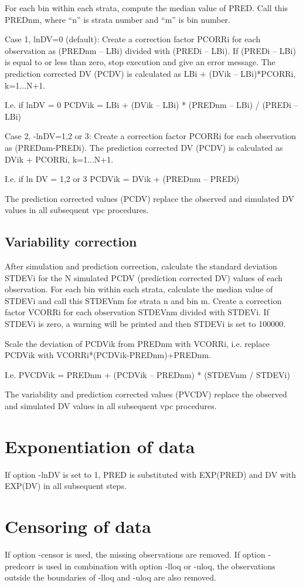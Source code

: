 For each bin within each strata, compute the median value of PRED. Call this PREDnm, where “n” is strata number and “m” is bin number. 

Case 1, lnDV=0 (default): Create a correction factor PCORRi for each observation as (PREDnm – LBi) divided with (PREDi – LBi). If (PREDi – LBi) is equal to or less than zero, stop execution and give an error message. The prediction corrected DV (PCDV) is calculated as 
LBi + (DVik – LBi)*PCORRi, k=1...N+1. 

I.e. if lnDV = 0		PCDVik = LBi + (DVik – LBi) * (PREDnm – LBi) / (PREDi – LBi)

Case 2, -lnDV=1,2 or 3: Create a correction factor PCORRi for each observation as (PREDnm-PREDi). The prediction corrected DV (PCDV) is calculated as DVik + PCORRi, k=1...N+1.   

I.e. if ln DV = 1,2 or 3	PCDVik = DVik + (PREDnm – PREDi)

The prediction corrected values (PCDV) replace the observed and simulated DV values in all subsequent vpc procedures.

\subsection{Variability correction}
After simulation and prediction correction, calculate the standard deviation STDEVi for  the N simulated PCDV (prediction corrected DV) values of each observation. For each bin within each strata, calculate the median value of STDEVi and call this STDEVnm for strata n and bin m. Create a correction factor VCORRi for each observation STDEVnm divided with STDEVi. If STDEVi is zero, a warning will be printed and then STDEVi is set to 100000.

Scale the deviation of PCDVik from PREDnm with VCORRi, i.e. replace PCDVik with VCORRi*(PCDVik-PREDnm)+PREDnm. 

I.e. 	PVCDVik = PREDnm + (PCDVik – PREDnm) * (STDEVnm / STDEVi)

The variability and prediction corrected values (PVCDV) replace the observed and simulated DV values in all subsequent vpc procedures.

\section{Exponentiation of data}
If option -lnDV is set to 1,  PRED is substituted with EXP(PRED) and DV with EXP(DV) in all subsequent steps. 

\section{Censoring of data}
If option -censor is used, the missing observations are removed. If option -predcorr is used in combination with option -lloq or -uloq, the observations outside the boundaries of -lloq and -uloq are also removed.

